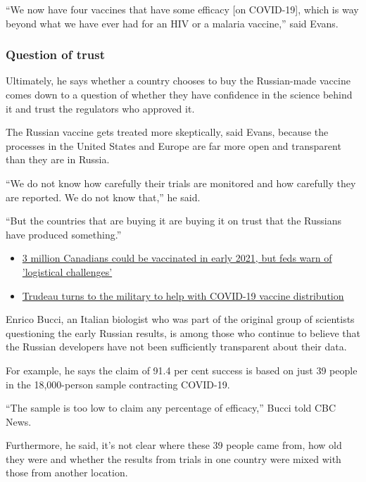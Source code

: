 \enquote{We now have four vaccines that have some efficacy [on COVID-19], which is way
beyond what we have ever had for an HIV or a malaria vaccine,} said Evans.

\subsubsection{Question of trust}

Ultimately, he says whether a country chooses to buy the Russian-made vaccine
comes down to a question of whether they have confidence in the science behind
it and trust the regulators who approved it.

The Russian vaccine gets treated more skeptically, said Evans, because the
processes in the United States and Europe are far more open and transparent
than they are in Russia.

\enquote{We do not know how carefully their trials are monitored and how carefully they
are reported. We do not know that,} he said.  

\enquote{But the countries that are buying it are buying it on trust that the Russians
have produced something.}

\begin{itemize}
\item \href{https://www.cbc.ca/news/politics/tasker-vaccine-briefing-logistical-challenges-1.5817577}{3 million Canadians could be vaccinated in early 2021, but feds warn of 'logistical challenges'}
\item \href{https://www.cbc.ca/news/politics/trudeau-vaccine-distribution-military-1.5819248}{%
Trudeau turns to the military to help with COVID-19 vaccine distribution}
\end{itemize}

Enrico Bucci, an Italian biologist who was part of the original group of
scientists questioning the early Russian results, is among those who continue
to believe that the Russian developers have not been sufficiently transparent
about their data.

For example, he says the claim of 91.4 per cent success is based on just 39
people in the 18,000-person sample contracting COVID-19.

\enquote{The sample is too low to claim any percentage of efficacy,} Bucci told CBC
News.

Furthermore, he said, it's not clear where these 39 people came from, how old
they were and whether the results from trials in one country were mixed with
those from another location.


